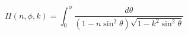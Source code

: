 \documentclass[12pt]{article}
\begin{document}
\begin{displaymath}
\Pi(n, \phi, k) = \int_0^\phi \frac{d\theta}{(1-n\sin^2\theta)\sqrt{1-k^2\sin^2\theta}}
\end{displaymath}
\end{document}
